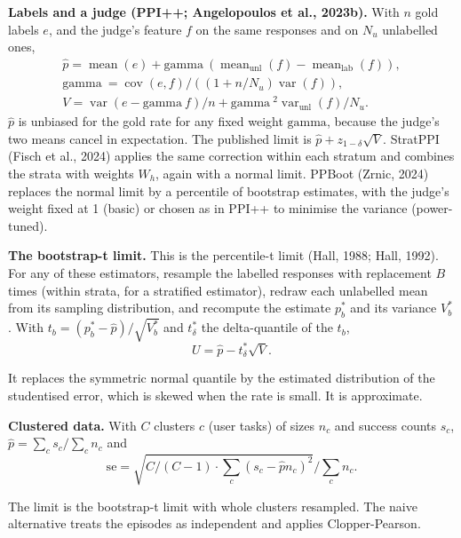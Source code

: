 \documentclass[11pt]{article}
\begin{document}
\textbf{Labels and a judge (PPI++; Angelopoulos et al., 2023b).} With $n$ gold labels $e$, and the judge's feature $f$ on the same responses and on $N_{u}$ unlabelled ones,
\begin{gather*}
\hat{p} = \operatorname{mean} (e ) + \text{gamma}\ ( \operatorname{mean}_{\mathrm{unl}} (f ) - \operatorname{mean}_{\mathrm{lab}} (f ) ), \\
\text{gamma}\ = \operatorname{cov} (e , f ) / ( (1 + n / N_{u} ) \operatorname{var} (f ) ), \\
V = \operatorname{var} (e - \text{gamma}\ f ) / n + \text{gamma}\ ^{2} \operatorname{var}_{\mathrm{unl}} (f ) / N_{u} .
\end{gather*}
$\hat{p}$ is unbiased for the gold rate for any fixed weight $\text{gamma}$, because the judge's two means cancel in expectation. The published limit is $\hat{p} + z_{1-\delta } \sqrt{V}$. StratPPI (Fisch et al., 2024) applies the same correction within each stratum and combines the strata with weights $W_{h}$, again with a normal limit. PPBoot (Zrnic, 2024) replaces the normal limit by a percentile of bootstrap estimates, with the judge's weight fixed at 1 (basic) or chosen as in PPI++ to minimise the variance (power-tuned).


\textbf{The bootstrap-t limit.} This is the percentile-t limit (Hall, 1988; Hall, 1992). For any of these estimators, resample the labelled responses with replacement $B$ times (within strata, for a stratified estimator), redraw each unlabelled mean from its sampling distribution, and recompute the estimate $p^{*}_{b}$ and its variance $V^{*}_{b}$. With $t_{b} = (p^{*}_{b} - \hat{p} ) / \sqrt{V^{*}_{b}}$ and $t^{*}_{\delta}$ the delta-quantile of the $t_{b}$,
\[
U = \hat{p} - t^{*}_{\delta} \sqrt{V}.
\]

It replaces the symmetric normal quantile by the estimated distribution of the studentised error, which is skewed when the rate is small. It is approximate.


\textbf{Clustered data.} With $C$ clusters $c$ (user tasks) of sizes $n_{c}$ and success counts $s_{c}$, $\hat{p} = \sum_{c} s_{c} / \sum_{c} n_{c}$ and
\[
\mathrm{se} = \sqrt{C / (C - 1) \cdot \sum_{c} (s_{c} - \hat{p} n_{c} )^{2}} / \sum_{c} n_{c} .
\]

The limit is the bootstrap-t limit with whole clusters resampled. The naive alternative treats the episodes as independent and applies Clopper-Pearson.
\end{document}

